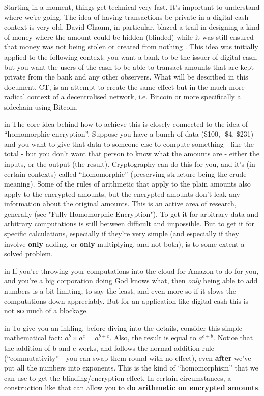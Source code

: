 \documentclass[10pt,a4paper]{article}
\begin{document}
Starting in a moment, things get technical very fast. It's important to understand where we're going. The idea of having transactions be private in a digital cash context is very old. David Chaum, in particular, blazed a trail in designing a kind of money where the amount could be hidden (blinded) while it was still ensured that money was not being stolen or created from nothing \cite{chaum_bs}. This idea was initially applied to the following context: you want a bank to be the issuer of digital cash, but you want the users of the cash to be able to transact amounts that are kept private from the bank and any other observers. What will be described in this document, CT, is an attempt to create the same effect but in the much more radical context of a decentralised network, i.e. Bitcoin or more specifically a sidechain using Bitcoin.

 in \noindent The core idea behind how to achieve this is closely connected to the idea of ``homomorphic encryption''. Suppose you have a bunch of data (\$100, -\$4, \$231) and you want to give that data to someone else to compute something - like the total - but you don't want that person to know what the amounts are - either the inputs, or the output (the result). Cryptography can do this for you, and it's (in certain contexts) called ``homomorphic'' (preserving structure being the crude meaning). Some of the rules of arithmetic that apply to the plain amounts also apply to the encrypted amounts, but the encrypted amounts don't leak any information about the original amounts. This is an active area of research, generally (see "Fully Homomorphic Encryption"). To get it for arbitrary data and arbitrary computations is still between difficult and impossible. But to get it for specific calculations, especially if they're very simple (and especially if they involve \textbf{only} adding, or \textbf{only} multiplying, and not both), is to some extent a solved problem.

 in \noindent  If you're throwing your computations into the cloud for Amazon to do for you, and you're a big corporation doing God knows what, then \textit{only} being able to add numbers is a bit limiting, to say the least, and even more so if it slows the computations down appreciably. But for an application like digital cash this is not \textbf{so} much of a blockage.

 in \noindent  To give you an inkling, before diving into the details, consider this simple mathematical fact: $a^b \times a^c = a^{b+c}$. Also, the result is equal to $a^{c+b}$. Notice that the addition of b and c works, and follows the normal addition rule (``commutativity'' - you can swap them round with no effect), even \textbf{after} we've put all the numbers into exponents. This is the kind of ``homomorphism'' that we can use to get the blinding/encryption effect. In certain circumstances, a construction like that can allow you to \textbf{do arithmetic on encrypted amounts}.
\end{document}
